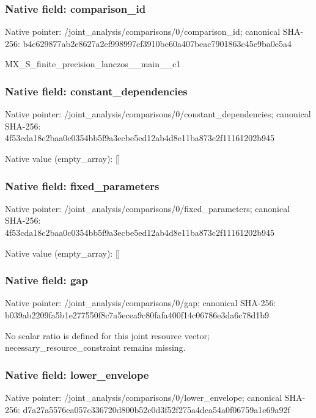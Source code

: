 \documentclass[10pt,a4paper]{article}
\begin{document}
\subsubsection{Native field: comparison\_\allowbreak{}id}
Native pointer: /joint\_\allowbreak{}analysis/comparisons/0/comparison\_\allowbreak{}id; canonical SHA-256: b4c629877ab2e8627a2ef998997cf3910be60a407beac7901863c45c9ba0e5a4

\begingroup\raggedright\sloppy MX\_\allowbreak{}S\_\allowbreak{}finite\_\allowbreak{}precision\_\allowbreak{}lanczos\_\allowbreak{}\_\allowbreak{}main\_\allowbreak{}\_\allowbreak{}c1\par\endgroup

\subsubsection{Native field: constant\_\allowbreak{}dependencies}
Native pointer: /joint\_\allowbreak{}analysis/comparisons/0/constant\_\allowbreak{}dependencies; canonical SHA-256: 4f53cda18c2baa0c0354bb5f9a3ecbe5ed12ab4d8e11ba873c2f11161202b945

Native value (empty\_\allowbreak{}array): []

\subsubsection{Native field: fixed\_\allowbreak{}parameters}
Native pointer: /joint\_\allowbreak{}analysis/comparisons/0/fixed\_\allowbreak{}parameters; canonical SHA-256: 4f53cda18c2baa0c0354bb5f9a3ecbe5ed12ab4d8e11ba873c2f11161202b945

Native value (empty\_\allowbreak{}array): []

\subsubsection{Native field: gap}
Native pointer: /joint\_\allowbreak{}analysis/comparisons/0/gap; canonical SHA-256: b039ab2209fa5b1e277550f8c7a5ecea9c80fafa400f14c06786e3da6c78d1b9

\begingroup\raggedright\sloppy No scalar ratio is defined for this joint resource vector;\allowbreak{} necessary\_\allowbreak{}resource\_\allowbreak{}constraint remains missing.\par\endgroup

\subsubsection{Native field: lower\_\allowbreak{}envelope}
Native pointer: /joint\_\allowbreak{}analysis/comparisons/0/lower\_\allowbreak{}envelope; canonical SHA-256: d7a27a5576ea057c336720d800b52c0d3f52f275a4dca54a0f06759a1e69a92f
\end{document}
